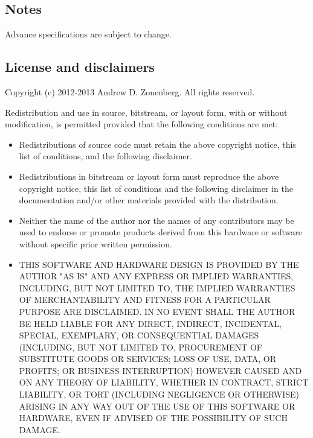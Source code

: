 \documentclass{article}
\begin{document}
\subsection{Notes}

Advance specifications are subject to change.

\subsection{License and disclaimers}
                                                                                                                   
Copyright (c) 2012-2013 Andrew D. Zonenberg. All rights reserved.

Redistribution and use in source, bitstream, or layout form, with or without modification, is permitted
provided that the following conditions are met:

\begin{itemize}
\item Redistributions of source code must retain the above copyright notice, this list of conditions, and the following
disclaimer.

\item Redistributions in bitstream or layout form must reproduce the above copyright notice, this list of conditions and
the following disclaimer in the documentation and/or other materials provided with the distribution.

\item Neither the name of the author nor the names of any contributors may be used to endorse or promote products
derived from this hardware or software without specific prior written permission.

\item THIS SOFTWARE AND HARDWARE DESIGN IS PROVIDED BY THE AUTHOR "AS IS" AND ANY EXPRESS OR IMPLIED WARRANTIES, 
INCLUDING, BUT NOT LIMITED TO, THE IMPLIED WARRANTIES OF MERCHANTABILITY AND FITNESS FOR A PARTICULAR PURPOSE ARE 
DISCLAIMED. IN NO EVENT SHALL THE AUTHOR BE HELD LIABLE FOR ANY DIRECT, INDIRECT, INCIDENTAL, SPECIAL, EXEMPLARY, OR 
CONSEQUENTIAL DAMAGES (INCLUDING, BUT NOT LIMITED TO, PROCUREMENT OF SUBSTITUTE GOODS OR SERVICES; LOSS OF USE, 
DATA, OR PROFITS; OR BUSINESS INTERRUPTION) HOWEVER CAUSED AND ON ANY THEORY OF LIABILITY, WHETHER IN CONTRACT, 
STRICT LIABILITY, OR TORT (INCLUDING NEGLIGENCE OR OTHERWISE) ARISING IN ANY WAY OUT OF THE USE OF THIS SOFTWARE OR 
HARDWARE, EVEN IF ADVISED OF THE POSSIBILITY OF SUCH DAMAGE.

\end{itemize}
\end{document}
